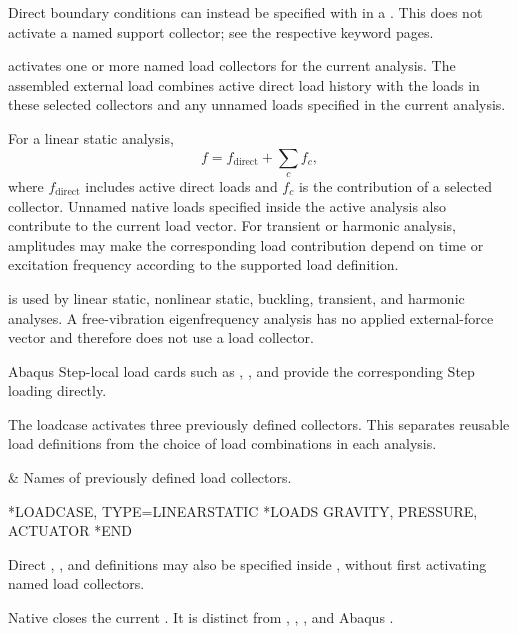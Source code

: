 Direct boundary conditions can instead be specified with
 in a . This does not activate a named
support collector; see the respective keyword pages.


 activates one or more named load collectors for the current analysis. The assembled external load combines active direct load history with the loads in these selected collectors and any unnamed loads specified in the current analysis.

For a linear static analysis,
\[
f=f_\mathrm{direct}+\sum_c f_c,
\]
where \(f_\mathrm{direct}\) includes active direct loads and \(f_c\) is the contribution of a selected collector. Unnamed native loads specified inside the active analysis also contribute to the current load vector. For transient or harmonic analysis, amplitudes may make the corresponding load contribution depend on time or excitation frequency according to the supported load definition.

 is used by linear static, nonlinear static, buckling, transient, and harmonic analyses. A free-vibration eigenfrequency analysis has no applied external-force vector and therefore does not use a load collector.

Abaqus Step-local load cards such as , , and  provide the corresponding Step loading directly.

The loadcase activates three previously defined collectors. This separates reusable load definitions from the choice of load combinations in each analysis.

\begin{keyworddata}
 & Names of previously defined load collectors. \\
\end{keyworddata}

\exampleheading

\begin{inputdeck}
*LOADCASE, TYPE=LINEARSTATIC
*LOADS
GRAVITY, PRESSURE, ACTUATOR
*END
\end{inputdeck}

Direct , , and  definitions
may also be specified inside , without first activating
named load collectors.


Native  closes the current . It is distinct from , , , and Abaqus .

